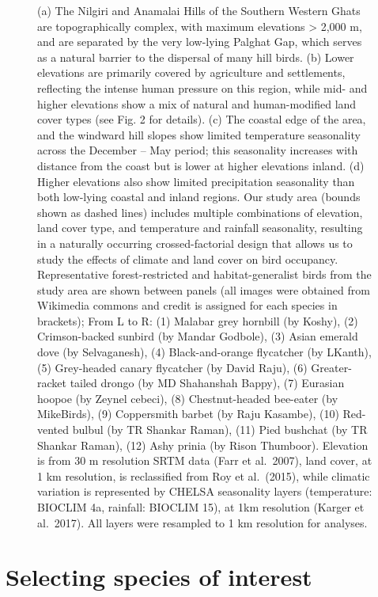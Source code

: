 \documentclass[
]{article}
\begin{document}
\begin{figure}
{(a) The Nilgiri and Anamalai Hills of the Southern Western Ghats are topographically complex, with maximum elevations \textgreater{} 2,000 m, and are separated by the very low-lying Palghat Gap, which serves as a natural barrier to the dispersal of many hill birds. (b) Lower elevations are primarily covered by agriculture and settlements, reflecting the intense human pressure on this region, while mid- and higher elevations show a mix of natural and human-modified land cover types (see Fig. 2 for details). (c) The coastal edge of the area, and the windward hill slopes show limited temperature seasonality across the December -- May period; this seasonality increases with distance from the coast but is lower at higher elevations inland. (d) Higher elevations also show limited precipitation seasonality than both low-lying coastal and inland regions. Our study area (bounds shown as dashed lines) includes multiple combinations of elevation, land cover type, and temperature and rainfall seasonality, resulting in a naturally occurring crossed-factorial design that allows us to study the effects of climate and land cover on bird occupancy. Representative forest-restricted and habitat-generalist birds from the study area are shown between panels (all images were obtained from Wikimedia commons and credit is assigned for each species in brackets); From L to R: (1) Malabar grey hornbill (by Koshy), (2) Crimson-backed sunbird (by Mandar Godbole), (3) Asian emerald dove (by Selvaganesh), (4) Black-and-orange flycatcher (by LKanth), (5) Grey-headed canary flycatcher (by David Raju), (6) Greater-racket tailed drongo (by MD Shahanshah Bappy), (7) Eurasian hoopoe (by Zeynel cebeci), (8) Chestnut-headed bee-eater (by MikeBirds), (9) Coppersmith barbet (by Raju Kasambe), (10) Red-vented bulbul (by TR Shankar Raman), (11) Pied bushchat (by TR Shankar Raman), (12) Ashy prinia (by Rison Thumboor). Elevation is from 30 m resolution SRTM data (Farr et al.~2007), land cover, at 1 km resolution, is reclassified from Roy et al.~(2015), while climatic variation is represented by CHELSA seasonality layers (temperature: BIOCLIM 4a, rainfall: BIOCLIM 15), at 1km resolution (Karger et al.~2017). All layers were resampled to 1 km resolution for analyses.}
\end{figure}

\hypertarget{selecting-species-of-interest}{%
\section{Selecting species of interest}\label{selecting-species-of-interest}}
\end{document}
